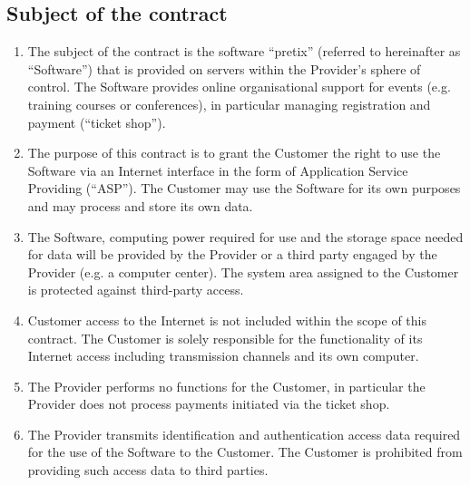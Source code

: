 \documentclass{terms}
\begin{document}
\subsection{Subject of the contract}
\begin{enumerate}
\item The subject of the contract is the software “pretix” (referred to hereinafter as “Software”) that is provided on servers within the Provider's sphere of control. The Software provides online organisational support for events (e.g. training courses or conferences), in particular managing registration and payment (“ticket shop”).
\item The purpose of this contract is to grant the Customer the right to use the Software via an Internet interface in the form of Application Service Providing (“ASP”). The Customer may use the Software for its own purposes and may process and store its own data.
\item The Software, computing power required for use and the storage space needed for data will be provided by the Provider or a third party engaged by the Provider (e.g. a computer center). The system area assigned to the Customer is protected against third-party access.
\item Customer access to the Internet is not included within the scope of this contract. The Customer is solely responsible for the functionality of its Internet access including transmission channels and its own computer.
\item The Provider performs no functions for the Customer, in particular the Provider does not process payments initiated via the ticket shop.
\item The Provider transmits identification and authentication access data required for the use of the Software to the Customer. The Customer is prohibited from providing such access data to third parties.
\end{enumerate}
\end{document}
